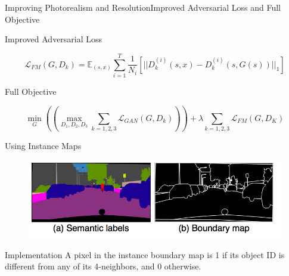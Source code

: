 \documentclass{beamer}
\begin{document}
\begin{frame}{Improving Photorealism and Resolution}{Improved Adversarial Loss and Full Objective}
%
%
\begin{beamerboxesrounded}[upper=uppercol,lower=lowercol,shadow=false]{	Improved Adversarial Loss}

\begin{equation}
\mathcal{L}_{FM}(G,D_k)=\mathbb{E}_{(s,x)} \sum_{i=1}^T \frac{1}{N_i}[||D_k^{(i)}(s,x)-D_{k}^{(i)}(s,G(s))||_1]
\end{equation}
\end{beamerboxesrounded}
%
%
\begin{beamerboxesrounded}[upper=uppercol,lower=lowercol,shadow=false]{	Full Objective }

\begin{equation}
\min_G ((\max_{D_1,D_2,D_3}\sum_{k=1,2,3} \mathcal{L}_{GAN}(G,D_k)))+\lambda \sum_{k=1,2,3}\mathcal{L}_{FM}(G,D_K)
\end{equation}
\end{beamerboxesrounded}


\end{frame}

\begin{frame}{Using Instance Maps}
\begin{figure}
	\centering
	\includegraphics[height=0.45\textheight]{images/instance_maps}
\end{figure}
%
%
\begin{beamerboxesrounded}[upper=uppercol,lower=lowercol,shadow=false]{Implementation }
A pixel in the instance boundary map is 1 if its object ID is different from any of its 4-neighbors, and 0 otherwise.
\end{beamerboxesrounded}
\end{frame}
\end{document}
